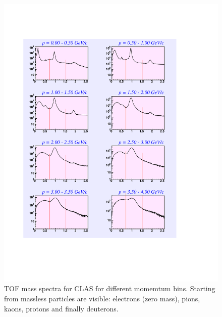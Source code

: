\begin{figure}[h]
 \begin{center}
  \includegraphics[width = 15cm, bb=0 120 500 750]{data_reduction/img/tof_mass}
  \caption[TOF mass spectra for CLAS]
          { TOF mass spectra for CLAS for different momemtum bins. Starting from massless particles are visible: electrons
                     (zero mass), pions, kaons, 
		     protons and finally deuterons.}
 \label{fig:tofmass}
 \end{center}
\end{figure}

